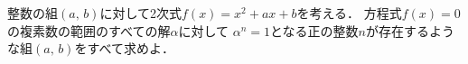 \documentclass[../../main.tex]{subfiles}
\begin{document}
整数の組$(a, \, b)$に対して2次式$f(x)=x^2+ax+b$を考える．
方程式$f(x)=0$の複素数の範囲のすべての解$\alpha$に対して
$\alpha^n=1$となる正の整数$n$が存在するような組$(a, \, b)$をすべて求めよ．
\end{document}
